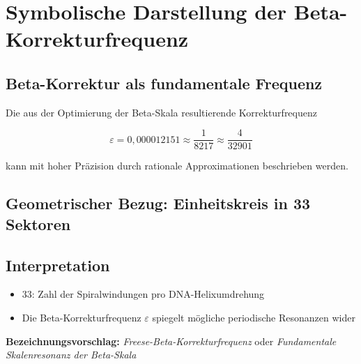 \documentclass{article}
\begin{document}
\section*{Symbolische Darstellung der Beta-Korrekturfrequenz}

\subsection*{Beta-Korrektur als fundamentale Frequenz}

Die aus der Optimierung der Beta-Skala resultierende Korrekturfrequenz

\[
\varepsilon = 0{,}000012151 \approx \frac{1}{8217} \approx \frac{4}{32901}
\]

kann mit hoher Präzision durch rationale Approximationen beschrieben werden.

\subsection*{Geometrischer Bezug: Einheitskreis in 33 Sektoren}

\begin{center}
\end{center}

\subsection*{Interpretation}
\begin{itemize}
  \item $33$: Zahl der Spiralwindungen pro DNA-Helixumdrehung
  \item Die Beta-Korrekturfrequenz $\varepsilon$ spiegelt mögliche periodische Resonanzen wider
\end{itemize}

\textbf{Bezeichnungsvorschlag:} \emph{Freese-Beta-Korrekturfrequenz} oder \emph{Fundamentale Skalenresonanz der Beta-Skala}
\end{document}

